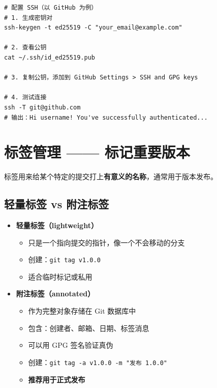 \documentclass[12pt,a4paper]{article}
\begin{document}
\begin{lstlisting}
# 配置 SSH（以 GitHub 为例）
# 1. 生成密钥对
ssh-keygen -t ed25519 -C "your_email@example.com"

# 2. 查看公钥
cat ~/.ssh/id_ed25519.pub

# 3. 复制公钥，添加到 GitHub Settings > SSH and GPG keys

# 4. 测试连接
ssh -T git@github.com
# 输出：Hi username! You've successfully authenticated...
\end{lstlisting}

\section{标签管理 —— 标记重要版本}

标签用来给某个特定的提交打上\textbf{有意义的名称}，通常用于版本发布。

\subsection{轻量标签 vs 附注标签}

\begin{itemize}[itemsep=5pt]
    \item \textbf{轻量标签（lightweight）}
    \begin{itemize}
        \item 只是一个指向提交的指针，像一个不会移动的分支
        \item 创建：\texttt{git tag v1.0.0}
        \item 适合临时标记或私用
    \end{itemize}

    \item \textbf{附注标签（annotated）}
    \begin{itemize}
        \item 作为完整对象存储在 Git 数据库中
        \item 包含：创建者、邮箱、日期、标签消息
        \item 可以用 GPG 签名验证真伪
        \item 创建：\texttt{git tag -a v1.0.0 -m "发布 1.0.0"}
        \item \textbf{推荐用于正式发布}
    \end{itemize}
\end{itemize}
\end{document}

